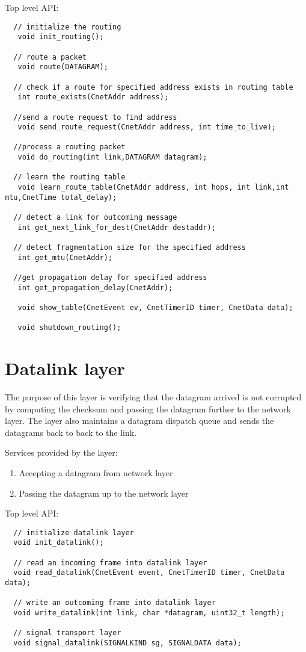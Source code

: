 \documentclass[11pt,a4paper,oneside]{report}
\begin{document}
    Top level API:  
  \begin{lstlisting}
  // initialize the routing
   void init_routing();

  // route a packet
   void route(DATAGRAM);

  // check if a route for specified address exists in routing table
   int route_exists(CnetAddr address);

  //send a route request to find address
   void send_route_request(CnetAddr address, int time_to_live);

  //process a routing packet
   void do_routing(int link,DATAGRAM datagram);

  // learn the routing table
   void learn_route_table(CnetAddr address, int hops, int link,int mtu,CnetTime total_delay);

  // detect a link for outcoming message
   int get_next_link_for_dest(CnetAddr destaddr);

  // detect fragmentation size for the specified address
   int get_mtu(CnetAddr);

  //get propagation delay for specified address
   int get_propagation_delay(CnetAddr);

   void show_table(CnetEvent ev, CnetTimerID timer, CnetData data);

   void shutdown_routing();
  \end{lstlisting}
\newpage

            
\section*{Datalink layer} 
The purpose of this layer is verifying that the datagram arrived is not
corrupted by computing the checksum and passing the datagram further to
the network layer. The layer also maintains a datagram dispatch queue 
and sends the datagrams back to back to the link.
    
    Services provided by the layer:
    \begin{enumerate}
      \item Accepting a datagram from network layer
      \item Passing the datagram up to the network layer 
    \end{enumerate}
    \newpage
    Top level API: 
  \begin{lstlisting}
  // initialize datalink layer
  void init_datalink();
  
  // read an incoming frame into datalink layer
  void read_datalink(CnetEvent event, CnetTimerID timer, CnetData data);
  
  // write an outcoming frame into datalink layer
  void write_datalink(int link, char *datagram, uint32_t length);
  
  // signal transport layer
  void signal_datalink(SIGNALKIND sg, SIGNALDATA data);
  \end{lstlisting} 
 
\end{document}
